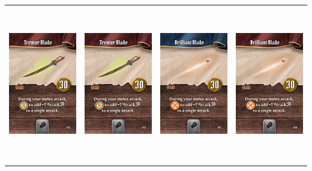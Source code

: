 \documentclass{minimal}
\begin{document}
{\begin{longtable}{llll}
\includegraphics[width=44mm,height=68mm]{./64-151/gh-080b-tremor-blade.png} &
\includegraphics[width=44mm,height=68mm]{./64-151/gh-080b-tremor-blade.png} &
\includegraphics[width=44mm,height=68mm]{./64-151/gh-081a-brilliant-blade.png} &
\includegraphics[width=44mm,height=68mm]{./64-151/gh-081b-brilliant-blade.png}\\ 

\end{longtable}}
\end{document}
